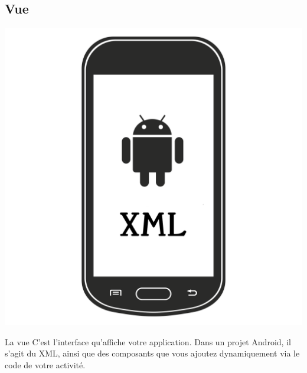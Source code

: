 \documentclass{beamer}
\begin{document}
\subsection{Vue}
\begin{frame}
\begin{center}
\includegraphics[scale=0.4]{view.png}
\end{center}
\begin{block}{La vue}
C'est l'interface qu'affiche votre application. Dans un projet Android, il s'agit du XML, ainsi que des composants que vous ajoutez dynamiquement via le code de votre activité.
\end{block}
\end{frame}
\end{document}
